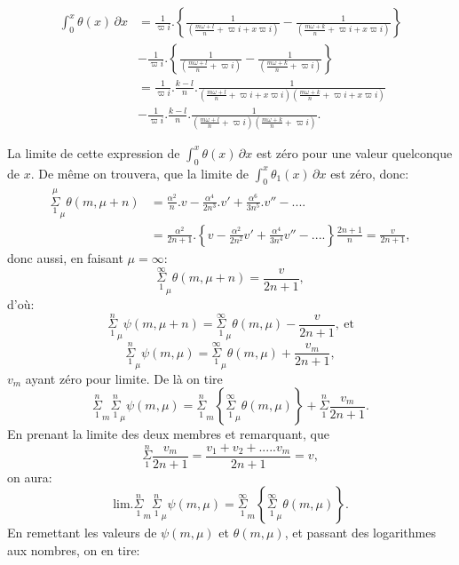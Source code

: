 \documentclass{article}
\begin{document}
\[ \begin{aligned}\int_{0}^{x}\theta(x)\,\partial x&=\frac{1}{\varpi i}.\left\{\frac{1}{\left(\frac{m\omega+l}{n}+\varpi i+x\varpi i\right)}-\frac{1}{\left(\frac{m\omega+k}{n}+\varpi i+x\varpi i\right)}\right\}\\ &-\frac{1}{\varpi i}.\left\{\frac{1}{\left(\frac{m\omega+l}{n}+\varpi i\right)}-\frac{1}{\left(\frac{m\omega+k}{n}+\varpi i\right)}\right\}\\ &=\frac{1}{\varpi i}.\frac{k-l}{n}.\frac{1}{\left(\frac{m\omega+l}{n}+\varpi i+x\varpi i\right)\left(\frac{m\omega+k}{n}+\varpi i+x\varpi i\right)}\\ &-\frac{1}{\varpi i}.\frac{k-l}{n}.\frac{1}{\left(\frac{m\omega+l}{n}+\varpi i\right)\left(\frac{m\omega+k}{n}+\varpi i\right)}.\end{aligned} \]

La limite de cette expression de $\displaystyle\int_{0}^{x}\theta(x)\,\partial x$ est zéro pour une valeur quelconque de $x$. De même on trouvera, que la limite de $\displaystyle\int_{0}^{x}\theta_{1}(x)\,\partial x$ est zéro, donc:
\[ \begin{aligned}\overset{\mu}{\underset{1}{\Sigma}}_{\mu}\theta(m,\mu+n)&=\frac{\alpha^{2}}{n}.v-\frac{\alpha^{4}}{2n^{3}}.v'+\frac{\alpha^{6}}{3n^{5}}.v''-....\\ &=\frac{\alpha^{2}}{2n+1}.\left\{v-\frac{\alpha^{2}}{2n^{2}}v'+\frac{\alpha^{4}}{3n^{4}}v''-....\right\}\frac{2n+1}{n}=\frac{v}{2n+1},\end{aligned} \]
donc aussi, en faisant $\mu=\infty$:
\[ \overset{\infty}{\underset{1}{\Sigma}}_{\mu}\theta(m,\mu+n)=\frac{v}{2n+1}, \]
d'où:
\[ \overset{n}{\underset{1}{\Sigma}}_{\mu}\psi(m,\mu+n)=\overset{\infty}{\underset{1}{\Sigma}}_{\mu}\theta(m,\mu)-\frac{v}{2n+1},\ \text{et} \]
\[ \overset{n}{\underset{1}{\Sigma}}_{\mu}\psi(m,\mu)=\overset{\infty}{\underset{1}{\Sigma}}_{\mu}\theta(m,\mu)+\frac{v_{m}}{2n+1}, \tag{170.} \]
$v_{m}$ ayant zéro pour limite. De là on tire
\[ \overset{n}{\underset{1}{\Sigma}}_{m}\overset{n}{\underset{1}{\Sigma}}_{\mu}\psi(m,\mu)=\overset{n}{\underset{1}{\Sigma}}_{m}\left\{\overset{\infty}{\underset{1}{\Sigma}}_{\mu}\theta(m,\mu)\right\}+\overset{n}{\underset{1}{\Sigma}}\frac{v_{m}}{2n+1}. \]
En prenant la limite des deux membres et remarquant, que
\[ \overset{n}{\underset{1}{\Sigma}}\frac{v_{m}}{2n+1}=\frac{v_{1}+v_{2}+.....v_{m}}{2n+1}=v, \]
on aura:
\[ \text{lim.}\overset{n}{\underset{1}{\Sigma}}_{m}\overset{n}{\underset{1}{\Sigma}}_{\mu}\psi(m,\mu)=\overset{\infty}{\underset{1}{\Sigma}}_{m}\left\{\overset{\infty}{\underset{1}{\Sigma}}_{\mu}\theta(m,\mu)\right\}. \tag{171.} \]
En remettant les valeurs de $\psi(m,\mu)$ et $\theta(m,\mu)$, et passant des logarithmes aux nombres, on en tire:
\end{document}
